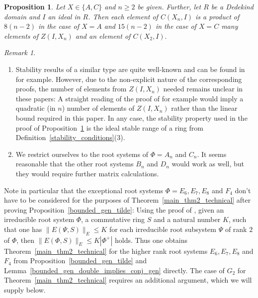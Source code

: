 \documentclass[12pt]{amsart}
\newtheorem{proposition}[theorem]{Proposition}
\theoremstyle{definition}\newtheorem{definition}[theorem]{Definition}
\theoremstyle{remark}\newtheorem{remark}[theorem]{Remark}
\theoremstyle{definition}\newtheorem{case}{Case}
\begin{document}
\begin{proposition}\label{stability}
Let $X\in\{A,C\}$ and $n\geq 2$ be given. Further, let $R$ be a Dedekind domain and $I$ an ideal in $R$. Then each element of $C(X_n,I)$ is a product of $8(n-2)$ in the case of $X=A$ and $15(n-2)$ in the case of $X=C$ many elements of ${Z(I,X_n)}$ and an element of $C(X_2,I).$
\end{proposition}

\begin{remark}
\hfill
\begin{enumerate}
\item
Stability results of a similar type are quite well-known and can be found in \cite{ MR0174604,sinchuk2018decompositions,197877,stepanov1989stable} for example. However, due to the non-explicit nature of the corresponding proofs, the number of elements from $Z(I,X_n)$ needed remains unclear in these papers: A straight reading of the proof of \cite[Theorem~4.2]{197877} for example would imply a quadratic (in $n$) number of elements of $Z(I,X_n)$ rather than the linear bound required in this paper. In any case, the stability property used in the proof of Proposition~\ref{stability} is the ideal stable range of a ring from Definition~\ref{stability_conditions}(3).
\item We restrict ourselves to the root systems of $\Phi=A_n$ and $C_n.$ It seems reasonable that the other root systems $B_n$ and $D_n$ would work as well, but they would require further matrix calculations. 
\end{enumerate}
\end{remark}





Note in particular that the exceptional root systems $\Phi=E_6,E_7,E_8$ and $F_4$ don't have to be considered for the purposes of Theorem~\ref{main_thm2_technical} after proving Proposition~\ref{bounded_gen_tilde}: Using the proof of \cite[Proposition~1]{MR1044049}, given an irreducible root system $\Phi$, a commutative ring $S$ and a natural number $K$, such that one has $\|E(\Psi,S)\|_E\leq K$ for each irreducible root subsystem $\Psi$ of rank $2$ of $\Phi$, then $\|E(\Phi,S)\|_E\leq K|\Phi^+|$ holds. Thus one obtains Theorem~\ref{main_thm2_technical} for the higher rank root systems $E_6,E_7,E_8$ and $F_4$ from Proposition~\ref{bounded_gen_tilde} and Lemma~\ref{bounded_gen_double_implies_conj_gen} directly. The case of $G_2$ for Theorem~\ref{main_thm2_technical} requires an additional argument, which we will supply below. 
\end{document}
